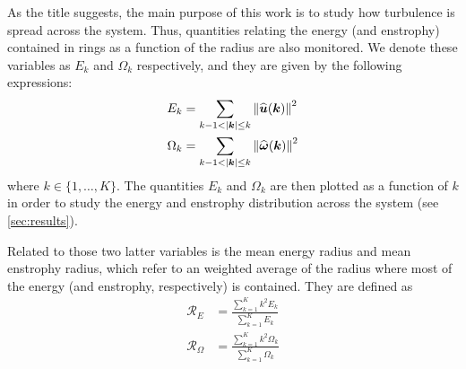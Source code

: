 \documentclass[../main.tex]{subfiles}
\begin{document}
As the title suggests, the main purpose of this work is to study how turbulence is spread across the system. Thus, quantities relating the energy (and enstrophy) contained in rings as a function of the radius are also monitored. We denote these variables as $E_k$ and $\Omega_k$ respectively, and they are given by the following expressions:
\begin{align}
	E_k      & = \sum_{k-1<\abs{\boldsymbol{k}}\leq k} \left\|\widehat{\boldsymbol{u}}(\boldsymbol{k})\right\|^2      \\
	\Omega_k & = \sum_{k-1<\abs{\boldsymbol{k}}\leq k} \left\|\widehat{\boldsymbol{\omega}}(\boldsymbol{k})\right\|^2
\end{align}
where $k\in\{1,\ldots,K\}$. The quantities $E_k$ and $\Omega_k$ are then plotted as a function of $k$ in order to study the energy and enstrophy distribution across the system (see \cref{sec:results}).

Related to those two latter variables is the mean energy radius and mean enstrophy radius, which refer to an weighted average of the radius where most of the energy (and enstrophy, respectively) is contained. They are defined as
\begin{align}
	\mathcal{R}_E      & = \frac{\sum_{k=1}^{K} k^2 E_k}{\sum_{k=1}^{K} E_k}           \\
	\mathcal{R}_\Omega & = \frac{\sum_{k=1}^{K} k^2 \Omega_k}{\sum_{k=1}^{K} \Omega_k}
\end{align}
\end{document}

